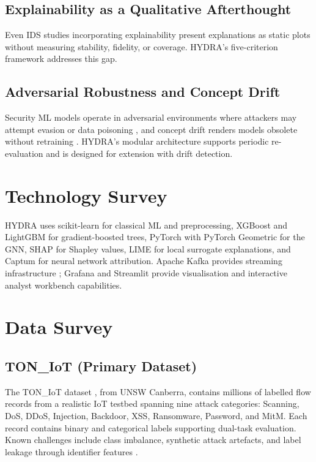 \documentclass[12pt,a4paper]{report}
\begin{document}
\subsection{Explainability as a Qualitative Afterthought}
\label{sec:xai-afterthought}

Even IDS studies incorporating explainability present explanations as static plots without measuring stability, fidelity, or coverage. HYDRA's five-criterion framework addresses this gap.

\subsection{Adversarial Robustness and Concept Drift}
\label{sec:adversarial}

Security ML models operate in adversarial environments where attackers may attempt evasion or data poisoning \cite{schwarzschild2021,goldblum2023}, and concept drift renders models obsolete without retraining \cite{gama2014}. HYDRA's modular architecture supports periodic re-evaluation and is designed for extension with drift detection.

\section{Technology Survey}
\label{sec:techsurvey}

HYDRA uses scikit-learn \cite{pedregosa2011} for classical ML and preprocessing, XGBoost and LightGBM for gradient-boosted trees, PyTorch \cite{paszke2019} with PyTorch Geometric \cite{fey2019} for the GNN, SHAP \cite{lundberg2023} for Shapley values, LIME for local surrogate explanations, and Captum for neural network attribution. Apache Kafka \cite{kafka2024} provides streaming infrastructure \cite{raptis2023,martin2022}; Grafana \cite{grafana2023} and Streamlit \cite{streamlit2023} provide visualisation and interactive analyst workbench capabilities.

\section{Data Survey}
\label{sec:datasurvey}

\subsection{TON\_IoT (Primary Dataset)}
\label{sec:toniot}

The TON\_IoT dataset \cite{moustafa2021}, from UNSW Canberra, contains millions of labelled flow records from a realistic IoT testbed spanning nine attack categories: Scanning, DoS, DDoS, Injection, Backdoor, XSS, Ransomware, Password, and MitM. Each record contains binary and categorical labels supporting dual-task evaluation. Known challenges include class imbalance, synthetic attack artefacts, and label leakage through identifier features \cite{ogunseyi2026,ferrag2022}.
\end{document}
